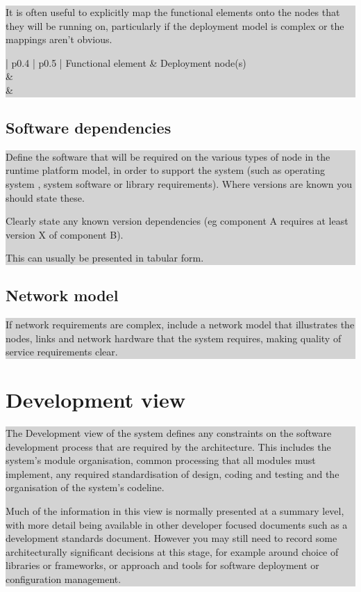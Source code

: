\documentclass[a4paper,11pt]{report}
\newcommand{\instructions}[1]{
  \noindent\colorbox{lightgray}{%
    \parbox{\linewidth}{%
      #1
    }%
  }%
 \vspace{0.1cm}
}
\begin{document}
\instructions{
It is often useful to explicitly map the functional elements onto the
nodes that they will be running on, particularly if the deployment
model is complex or the mappings aren’t obvious.

\begin{center}
  \begin{tabular}[h!]{| p{0.4\textwidth} | p{0.5\textwidth} |}
    \hline
    \rowcolor{gray}
    Functional element & Deployment node(s) \\
    \hline
    \hline
    & \\
    \hline
    & \\
    \hline
  \end{tabular}
\end{center}

}

\subsection{Software dependencies}
\label{sec:softw-depend}

\instructions{
Define the software that will be required on the various types of node
in the runtime platform model, in order to support the system (such as
operating system , system software or library requirements). Where
versions are known you should state these.

Clearly state any known version dependencies (eg component A requires
at least version X of component B).

This can usually be presented in tabular form.
}

\subsection{Network model}
\label{sec:network-model}

\instructions{
If network requirements are complex, include a network model that
illustrates the nodes, links and network hardware that the system
requires, making quality of service requirements clear.
}

\section{Development view}
\label{sec:development-view}

\instructions{
The Development view of the system defines any constraints on the
software development process that are required by the
architecture. This includes the system’s module organisation, common
processing that all modules must implement, any required
standardisation of design, coding and testing and the organisation of
the system’s codeline.

Much of the information in this view is normally presented at a
summary level, with more detail being available in other developer
focused documents such as a development standards document. However
you may still need to record some architecturally significant
decisions at this stage, for example around choice of libraries or
frameworks, or approach and tools for software deployment or
configuration management.
}
\end{document}
